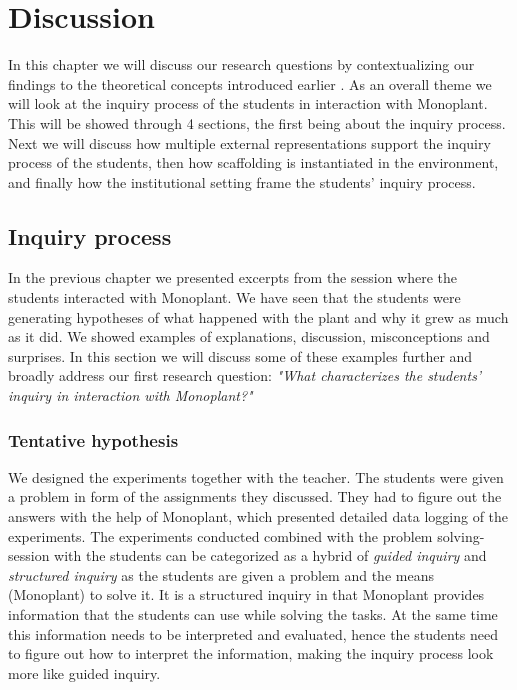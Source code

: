 \chapter{Discussion}
In this chapter we will discuss our research questions by contextualizing our findings to the theoretical concepts introduced earlier . As an overall theme we will look at the inquiry process of the students in interaction with Monoplant. This will be showed through 4 sections, the first being about the inquiry process. Next we will discuss how multiple external representations support the inquiry process of the students, then how scaffolding is instantiated in the environment, and finally how the institutional setting frame the students' inquiry process.


\section{Inquiry process}
In the previous chapter we presented excerpts from the session where the students interacted with Monoplant. We have seen that the students were generating hypotheses of what happened with the plant and why it grew as much as it did. We showed examples of explanations, discussion, misconceptions and surprises. In this section we will discuss some of these examples further and broadly address our first research question: \emph{"What characterizes the students’ inquiry in interaction with Monoplant?"}

\subsection{Tentative hypothesis}
We designed the experiments together with the teacher. The students were given a problem in form of the assignments they discussed. They had to figure out the answers with the help of Monoplant, which presented detailed data logging of the experiments. The experiments conducted combined with the problem solving-session with the students can be categorized as a hybrid of \emph{guided inquiry} and \emph{structured inquiry} \citetext{\citet{staver1987analysis}, referenced in \citealp{prince2006inductive}} as the students are given a problem and the means (Monoplant) to solve it. It is a structured inquiry in that Monoplant provides information that the students can use while solving the tasks. At the same time this information needs to be interpreted and evaluated, hence the students need to figure out how to interpret the information, making the inquiry process look more like guided inquiry.

